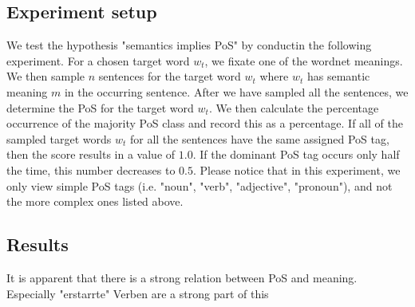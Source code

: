 \documentclass[a4paper,12pt,twoside,openright]{report}
\begin{document}
\subsection{Experiment setup}

We test the hypothesis "semantics implies PoS" by conductin the following experiment.
For a chosen target word $w_t$, we fixate one of the wordnet meanings.
We then sample $n$ sentences for the target word $w_t$ where $w_t$ has semantic meaning $m$ in the occurring sentence.
After we have sampled all the sentences, we determine the PoS for the target word $w_t$.
We then calculate the percentage occurrence of the majority PoS class and record this as a percentage.
If all of the sampled target words $w_t$ for all the sentences have the same assigned PoS tag, then the score results in a value of $1.0$.
If the dominant PoS tag occurs only half the time, this number decreases to $0.5$.
Please notice that in this experiment, we only view simple PoS tags (i.e. "noun", "verb", "adjective", "pronoun"), and not the more complex ones listed above.

\subsection{Results}

It is apparent that there is a strong relation between PoS and meaning. 
Especially "erstarrte" Verben are a strong part of this
\end{document}

